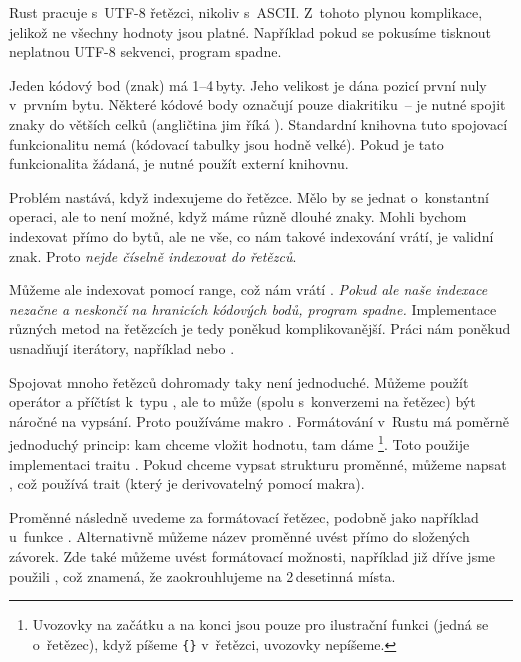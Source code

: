 \documentclass[main.tex]{subfiles}
\begin{document}

Rust pracuje s~UTF-8 řetězci, nikoliv s~ASCII. Z~tohoto plynou komplikace, jelikož ne
všechny hodnoty jsou platné. Například pokud se pokusíme tisknout neplatnou UTF-8
sekvenci, program spadne.


Jeden kódový bod (znak) má 1--4\,byty. Jeho velikost je dána pozicí první nuly v~prvním
bytu. Některé kódové body označují pouze diakritiku~-- je nutné spojit znaky do větších
celků (angličtina jim říká ). Standardní knihovna tuto spojovací
funkcionalitu nemá (kódovací tabulky jsou hodně velké). Pokud je tato funkcionalita
žádaná, je nutné použít externí knihovnu. \cite[sekce\,8.2]{thebook}


Problém nastává, když indexujeme do řetězce. Mělo by se jednat o~konstantní operaci, ale
to není možné, když máme různě dlouhé znaky. Mohli bychom indexovat přímo do bytů, ale ne
vše, co nám takové indexování vrátí, je validní znak. Proto
\emph{nejde číselně indexovat do řetězců}.

Můžeme ale indexovat pomocí range, což nám vrátí . \emph{Pokud ale naše
    indexace nezačne a neskončí na hranicích kódových bodů, program spadne.} Implementace
různých metod na řetězcích je tedy poněkud komplikovanější. Práci nám poněkud usnadňují
iterátory, například  nebo . \cite[sekce\,8.2]{thebook}


Spojovat mnoho řetězců dohromady taky není jednoduché. Můžeme použít \irust{+} operátor a
příčtíst  k~typu , ale to může (spolu s~konverzemi na řetězec)
být náročné na vypsání. Proto používáme makro . Formátování v~Rustu má
poměrně jednoduchý princip: kam chceme vložit hodnotu, tam dáme \footnote{
    Uvozovky na začátku a na konci jsou pouze pro ilustrační funkci (jedná se o~řetězec),
    když píšeme \texttt{\{\}} v~řetězci, uvozovky nepíšeme.
}. Toto použije implementaci traitu . Pokud chceme vypsat strukturu
proměnné, můžeme napsat , což používá  trait (který je
derivovatelný pomocí makra). \cite[sekce\,8.2]{thebook}

Proměnné následně uvedeme za formátovací řetězec, podobně jako například u~funkce
. Alternativně můžeme název proměnné uvést přímo do složených závorek. Zde
také můžeme uvést formátovací možnosti, například již dříve jsme použili ,
což znamená, že zaokrouhlujeme na 2\,desetinná místa.
\end{document}

